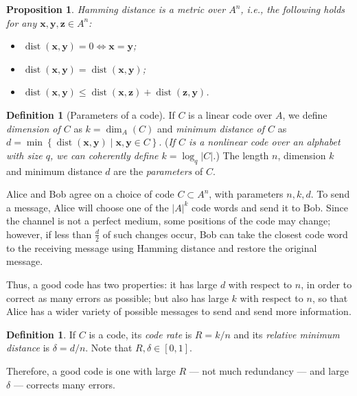 \documentclass[11pt, oneside]{amsart}
\newtheorem{prop}[thm]{Proposition}
\theoremstyle{definition}
\newtheorem{defn}[thm]{Definition}
\theoremstyle{remark}
\numberwithin{equation}{section}
\DeclareMathOperator{\dist}{dist}
\DeclareMathOperator{\dimension}{dim}
\begin{document}
\begin{prop} \label{prop:hamming}
    Hamming distance is a metric over $A^n$, i.e., the following holds for any $\mathbf{x}, \mathbf{y}, \mathbf{z} \in A^n$:
    \begin{itemize}[noitemsep]
        \item $\dist(\mathbf{x}, \mathbf{y}) = 0 \iff \mathbf{x} = \mathbf{y}$;
        \item $\dist(\mathbf{x}, \mathbf{y}) = \dist(\mathbf{x}, \mathbf{y})$;
        \item $\dist(\mathbf{x}, \mathbf{y}) \le \dist(\mathbf{x}, \mathbf{z}) + \dist(\mathbf{z}, \mathbf{y})$.
    \end{itemize}
\end{prop}

\begin{defn}[Parameters of a code]
    If $C$ is a linear code over $A$, we define \emph{dimension of $C$} as $k = \dimension_A(C)$ and \emph{minimum distance of $C$} as $d = \min\left\{\dist(\mathbf{x}, \mathbf{y}) \mid \mathbf{x}, \mathbf{y} \in C\right\}$.
	(\emph{If $C$ is a nonlinear code over an alphabet with size $q$, we can coherently define $k = \log_q{\left|C\right|}$.})
	The length $n$, dimension $k$ and minimum distance $d$ are the \emph{parameters} of $C$.
\end{defn}

Alice and Bob agree on a choice of code $C \subset A^n$, with parameters $n, k, d$.
To send a message, Alice will choose one of the $|A|^k$ code words and send it to Bob.
Since the channel is not a perfect medium, some positions of the code may change;
however, if less than $\frac{d}{2}$ of such changes occur, Bob can take the closest code word to the receiving message using Hamming distance and restore the original message.

Thus, a good code has two properties: it has large $d$ with respect to $n$, in order to correct as many errors as possible;
but also has large $k$ with respect to $n$, so that Alice has a wider variety of possible messages to send and send more information.

\begin{defn}
	If $C$ is a code, its \emph{code rate} is $R = k/n$ and its \emph{relative minimum distance} is $\delta = d/n$.
	Note that $R, \delta \in [0, 1]$.
\end{defn}

Therefore, a good code is one with large $R$ --- not much redundancy --- and large $\delta$ --- corrects many errors. 
\end{document}
